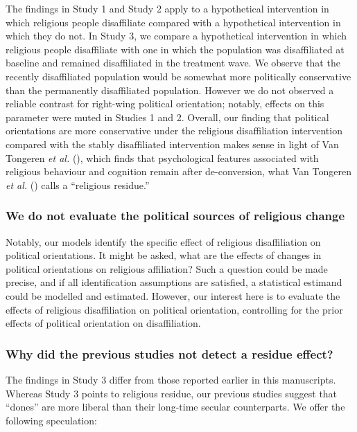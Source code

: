 \documentclass[
  singlecolumn]{article}
\begin{document}
The findings in Study 1 and Study 2 apply to a hypothetical intervention
in which religious people disaffiliate compared with a hypothetical
intervention in which they do not. In Study 3, we compare a hypothetical
intervention in which religious people disaffiliate with one in which
the population was disaffiliated at baseline and remained disaffiliated
in the treatment wave. We observe that the recently disaffiliated
population would be somewhat more politically conservative than the
permanently disaffiliated population. However we do not observed a
reliable contrast for right-wing political orientation; notably, effects
on this parameter were muted in Studies 1 and 2. Overall, our finding
that political orientations are more conservative under the religious
disaffiliation intervention compared with the stably disaffiliated
intervention makes sense in light of Van Tongeren \emph{et al.}
(), which finds that psychological
features associated with religious behaviour and cognition remain after
de-conversion, what Van Tongeren \emph{et al.}
() calls a ``religious residue.''

\subsubsection{We do not evaluate the political sources of religious
change}\label{we-do-not-evaluate-the-political-sources-of-religious-change}

Notably, our models identify the specific effect of religious
disaffiliation on political orientations. It might be asked, what are
the effects of changes in political orientations on religious
affiliation? Such a question could be made precise, and if all
identification assumptions are satisfied, a statistical estimand could
be modelled and estimated. However, our interest here is to evaluate the
effects of religious disaffiliation on political orientation,
controlling for the prior effects of political orientation on
disaffiliation.

\subsubsection{Why did the previous studies not detect a residue
effect?}\label{why-did-the-previous-studies-not-detect-a-residue-effect}

The findings in Study 3 differ from those reported earlier in this
manuscripts. Whereas Study 3 points to religious residue, our previous
studies suggest that ``dones'' are more liberal than their long-time
secular counterparts. We offer the following speculation:
\end{document}
